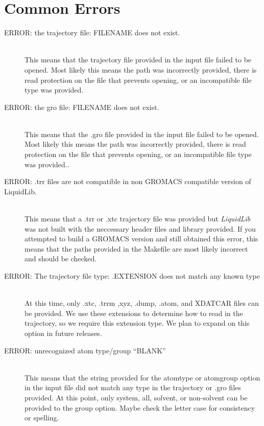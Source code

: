 \documentclass{article}
\begin{document}
\section{Common Errors} \label{sec::errors}
\begin{description}		
	\item[ERROR: the trajectory file: FILENAME does not exist.] \hfill \\
	This means that the trajectory file provided in the input file failed to be opened.  Most likely this means the path was incorrectly provided, there is read protection on the file that prevents opening, or an incompatible file type was provided.
	
	\item[ERROR: the gro file: FILENAME does not exist.] \hfill \\
	This means that the .gro file provided in the input file failed to be opened.  Most likely this means the path was incorrectly provided, there is read protection on the file that prevents opening, or an incompatible file type was provided..
	
	\item[ERROR: .trr files are not compatible in non GROMACS compatible version of LiquidLib.] \hfill \\
	This means that a .trr or .xtc trajectory file was provided but \textit{LiquidLib} was not built with the neccessary header files and library provided.  If you attempted to build a GROMACS version and still obtained this error, this means that the paths provided in the Makefile are most likely incorrect and should be checked.
	
	\item[ERROR: The trajectory file type: .EXTENSION does not match any known type] \hfill \\
	At this time, only .xtc, .trrm ,xyz, .dump, .atom, and XDATCAR files can be provided.  We use these extensions to determine how to read in the trajectory, so we require this extension type.  We plan to expand on this option in future releases.
	
	\item[ERROR: unrecognized atom type/group ``BLANK''] \hfill \\
	This means that the string provided for the atomtype or atomgroup option in the input file did not match any type in the trajectory or .gro files provided.  At this point, only system, all, solvent, or non-solvent can be provided to the group option.  Maybe check the letter case for consistency or spelling.
	

\end{description}
\end{document}
